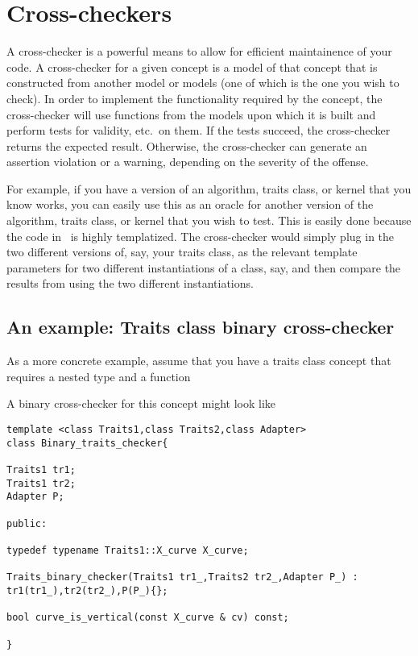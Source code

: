 \section{Cross-checkers\label{sec:debugging_cross_checker}}

A cross-checker is a powerful means to allow for efficient
maintainence of your code.  A cross-checker for a given concept is a
model of that concept  that is
constructed from another model or models (one of which is the one you
wish to check).  In order to implement the functionality required by
the concept, the cross-checker will use functions from the models upon
which it is built and perform tests for validity, etc.\ on them.  If
the tests succeed, the cross-checker returns the expected result.
Otherwise, the cross-checker can generate an assertion violation or a
warning, depending on the severity of the offense.

For example, if you have a version of an algorithm, traits class, or
kernel that you know works, you can easily use this as an oracle for
another version of the algorithm, traits class, or kernel that you
wish to test.  This is easily done because the code in \cgal\ is
highly templatized.  The cross-checker would simply plug in the two
different versions of, say, your traits class, as the relevant
template parameters for two different instantiations of a class, say,
and then compare the results from using the two different
instantiations.

\subsection*{An example: Traits class binary cross-checker}

As a more concrete example, assume that you have a traits class concept 
that requires a nested type  and a function


A binary cross-checker for this concept might look like 
\begin{verbatim}
template <class Traits1,class Traits2,class Adapter>
class Binary_traits_checker{

Traits1 tr1;
Traits1 tr2;
Adapter P;

public:

typedef typename Traits1::X_curve X_curve;

Traits_binary_checker(Traits1 tr1_,Traits2 tr2_,Adapter P_) :
tr1(tr1_),tr2(tr2_),P(P_){};

bool curve_is_vertical(const X_curve & cv) const;

}
\end{verbatim}

